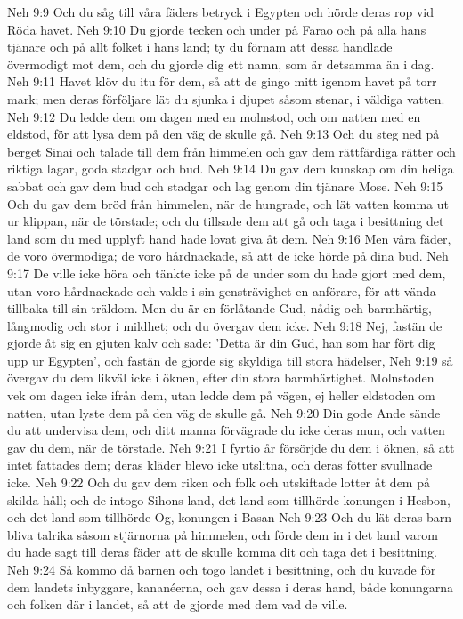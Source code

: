 Neh 9:9  Och du såg till våra fäders betryck i Egypten och hörde deras rop vid Röda havet.
Neh 9:10  Du gjorde tecken och under på Farao och på alla hans tjänare och på allt folket i hans land; ty du förnam att dessa handlade övermodigt mot dem, och du gjorde dig ett namn, som är detsamma än i dag.
Neh 9:11  Havet klöv du itu för dem, så att de gingo mitt igenom havet på torr mark; men deras förföljare lät du sjunka i djupet såsom stenar, i väldiga vatten.
Neh 9:12  Du ledde dem om dagen med en molnstod, och om natten med en eldstod, för att lysa dem på den väg de skulle gå.
Neh 9:13  Och du steg ned på berget Sinai och talade till dem från himmelen och gav dem rättfärdiga rätter och riktiga lagar, goda stadgar och bud.
Neh 9:14  Du gav dem kunskap om din heliga sabbat och gav dem bud och stadgar och lag genom din tjänare Mose.
Neh 9:15  Och du gav dem bröd från himmelen, när de hungrade, och lät vatten komma ut ur klippan, när de törstade; och du tillsade dem att gå och taga i besittning det land som du med upplyft hand hade lovat giva åt dem.
Neh 9:16  Men våra fäder, de voro övermodiga; de voro hårdnackade, så att de icke hörde på dina bud.
Neh 9:17  De ville icke höra och tänkte icke på de under som du hade gjort med dem, utan voro hårdnackade och valde i sin gensträvighet en anförare, för att vända tillbaka till sin träldom. Men du är en förlåtande Gud, nådig och barmhärtig, långmodig och stor i mildhet; och du övergav dem icke.
Neh 9:18  Nej, fastän de gjorde åt sig en gjuten kalv och sade: 'Detta är din Gud, han som har fört dig upp ur Egypten', och fastän de gjorde sig skyldiga till stora hädelser,
Neh 9:19  så övergav du dem likväl icke i öknen, efter din stora barmhärtighet. Molnstoden vek om dagen icke ifrån dem, utan ledde dem på vägen, ej heller eldstoden om natten, utan lyste dem på den väg de skulle gå.
Neh 9:20  Din gode Ande sände du att undervisa dem, och ditt manna förvägrade du icke deras mun, och vatten gav du dem, när de törstade.
Neh 9:21  I fyrtio år försörjde du dem i öknen, så att intet fattades dem; deras kläder blevo icke utslitna, och deras fötter svullnade icke.
Neh 9:22  Och du gav dem riken och folk och utskiftade lotter åt dem på skilda håll; och de intogo Sihons land, det land som tillhörde konungen i Hesbon, och det land som tillhörde Og, konungen i Basan
Neh 9:23  Och du lät deras barn bliva talrika såsom stjärnorna på himmelen, och förde dem in i det land varom du hade sagt till deras fäder att de skulle komma dit och taga det i besittning.
Neh 9:24  Så kommo då barnen och togo landet i besittning, och du kuvade för dem landets inbyggare, kananéerna, och gav dessa i deras hand, både konungarna och folken där i landet, så att de gjorde med dem vad de ville.
